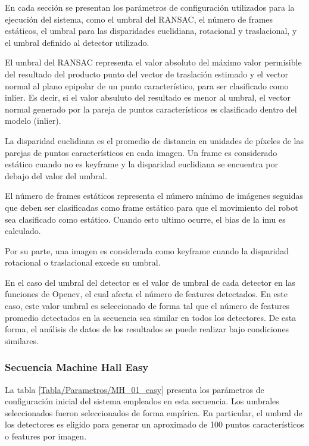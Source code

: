  
En cada sección se presentan los parámetros de configuración utilizados para la ejecución del sistema, como el umbral del RANSAC, el número de frames estáticos, el umbral para las disparidades euclidiana, rotacional y traslacional, y el umbral definido al detector utilizado. 
 
 El umbral del RANSAC representa el valor absoluto del máximo valor permisible del resultado del producto punto del vector de traslación estimado y el vector normal al plano epipolar de un punto característico, para ser clasificado como inlier. Es decir, si el valor absuluto del resultado es menor al umbral, el vector normal generado por la pareja de puntos característicos es clasificado dentro del modelo (inlier).
 
 La disparidad euclidiana es el promedio de distancia en unidades de píxeles de las parejas de puntos característicos en cada imagen. Un frame es considerado estático cuando no es keyframe y la disparidad euclidiana se encuentra por debajo del valor del umbral.
 
 El número de frames estáticos representa el número mínimo de imágenes seguidas que deben ser clasificadas como frame estático para que el movimiento del robot sea clasificado como estático. Cuando esto ultimo ocurre, el bias de la imu es calculado.

 Por su parte, una imagen es considerada como keyframe cuando la disparidad rotacional o traslacional excede su umbral.
 
 En el caso del umbral del detector es el valor de umbral de cada detector en las funciones de Opencv, el cual afecta el número de features detectados. En este caso, este valor umbral es seleccionado de forma tal que el número de features promedio detectados en la secuencia sea similar en todos los detectores. De esta forma, el análisis de datos de los resultados se puede realizar bajo condiciones similares.

\subsubsection{Secuencia Machine Hall Easy}


La tabla \ref{Tabla/Parametros/MH_01_easy} presenta los parámetros de configuración inicial del sistema empleados en esta secuencia. Los umbrales seleccionados fueron seleccionados de forma empírica. En particular, el umbral de los detectores es eligido para generar un aproximado de 100 puntos característicos o features por imagen.

